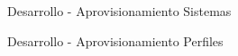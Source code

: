 \begin{frame}{Desarrollo - Aprovisionamiento}
    \vspace{0cm} {Sistemas}
    \vspace{0cm}
    \begin{figure}[ht]
       \centering
    \end{figure}

\end{frame}

\begin{frame}{Desarrollo - Aprovisionamiento}
    \vspace{0cm} {Perfiles}
    \vspace{0cm}
    \begin{figure}[ht]
       \centering
    \end{figure}

\end{frame}

